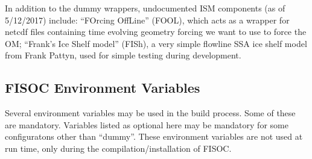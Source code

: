 \documentclass[12pt]{article}
\begin{document}
In addition to the dummy wrappers, undocumented ISM components 
(as of 5/12/2017) include: 
``FOrcing OffLine'' (FOOL), which acts as a wrapper for netcdf files 
containing time evolving geometry forcing we want to use to force the 
OM; 
``Frank's Ice Shelf model'' (FISh), a very simple flowline SSA 
ice shelf model from Frank Pattyn, used for simple testing during 
development.



\subsection{FISOC Environment Variables}
\label{sec:EnvVars}

Several environment variables may be used in the build process. 
Some of these are mandatory. 
Variables listed as optional here may be mandatory for some configuratons 
other than ``dummy''.
These environment variables are not used at run time, only during 
the compilation/installation of FISOC.
\end{document}
